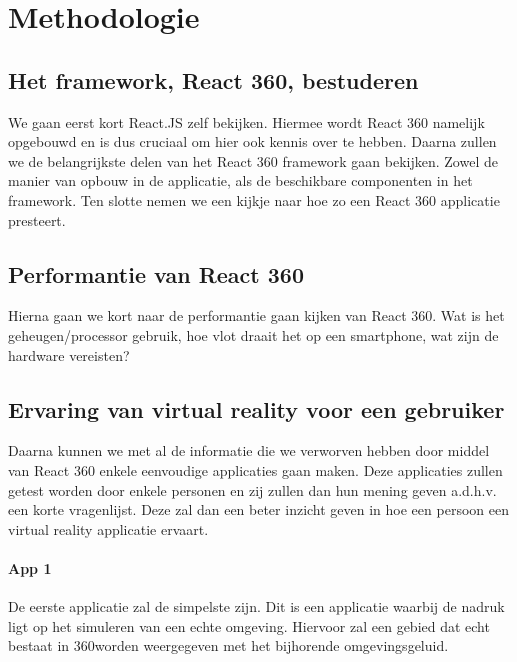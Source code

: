 
\chapter{Methodologie}
\label{ch:methodologie}


\section{Het framework, React 360, bestuderen}
\label{sec:reactvr-bestuderen}
We gaan eerst kort React.JS zelf bekijken. Hiermee wordt React 360 namelijk opgebouwd en is dus cruciaal om hier ook kennis over te hebben. Daarna zullen we de belangrijkste delen van het React 360 framework gaan bekijken. Zowel de manier van opbouw in de applicatie, als de beschikbare componenten in het framework. Ten slotte nemen we een kijkje naar hoe zo een React 360 applicatie presteert.

\section{Performantie van React 360}
\label{sec:performantie-react360}
Hierna gaan we kort naar de performantie gaan kijken van React 360. Wat is het geheugen/processor gebruik, hoe vlot draait het op een smartphone, wat zijn de hardware vereisten?

\section{Ervaring van virtual reality voor een gebruiker}
\label{sec:ervaring-vr-app}
Daarna kunnen we met al de informatie die we verworven hebben door middel van React 360 enkele eenvoudige applicaties gaan maken. Deze applicaties zullen getest worden door enkele personen en zij zullen dan hun mening geven a.d.h.v. een korte vragenlijst. Deze zal dan een beter inzicht geven in hoe een persoon een virtual reality applicatie ervaart.

\subsubsection{App 1}
De eerste applicatie zal de simpelste zijn. Dit is een applicatie waarbij de nadruk ligt op het simuleren van een echte omgeving. Hiervoor zal een gebied dat echt bestaat in 360\textdegree worden weergegeven met het bijhorende omgevingsgeluid. 
